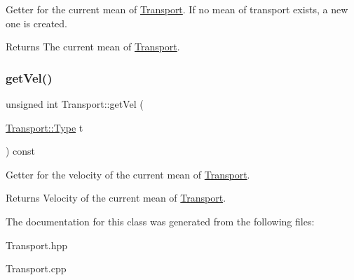 Getter for the current mean of \hyperlink{class_transport}{Transport}. If no mean of transport exists, a new one is created.

\begin{DoxyReturn}{Returns}
The current mean of \hyperlink{class_transport}{Transport}. 
\end{DoxyReturn}
\hypertarget{class_transport_ae9b8f3d27331e429160827194e32bde1}{}\label{class_transport_ae9b8f3d27331e429160827194e32bde1} 
\subsubsection{\texorpdfstring{get\+Vel()}{getVel()}}
{\footnotesize\ttfamily unsigned int Transport\+::get\+Vel (\begin{DoxyParamCaption}\item[{\hyperlink{class_transport_a1879cecfed0d4238e5a7af6d085db317}{Transport\+::\+Type}}]{t }\end{DoxyParamCaption}) const}

Getter for the velocity of the current mean of \hyperlink{class_transport}{Transport}.

\begin{DoxyReturn}{Returns}
Velocity of the current mean of \hyperlink{class_transport}{Transport}. 
\end{DoxyReturn}


The documentation for this class was generated from the following files\+:\begin{DoxyCompactItemize}
\item 
Transport.\+hpp\item 
Transport.\+cpp\end{DoxyCompactItemize}
